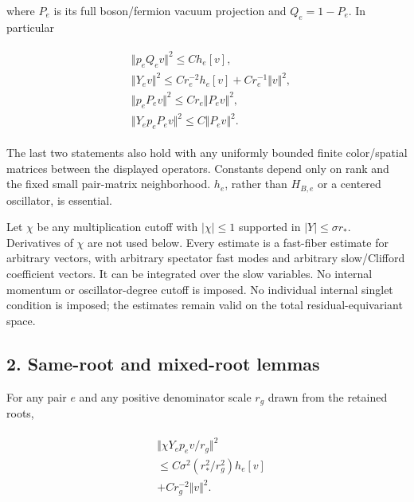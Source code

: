 where \(P_{e}\) is its full boson/fermion vacuum projection and
\(Q_{e}=1-P_{e}\). In particular

\begin{gather*}
\begin{aligned}
& \Vert p_{e} Q_{e} v\Vert ^{2} \le  C h_{e}[v], \\
& \Vert Y_{e} v\Vert ^{2} \le  C r_{e}^{-2} h_{e}[v] + C r_{e}^{-1} \Vert v\Vert ^{2}, \\
& \Vert p_{e} P_{e} v\Vert ^{2} \le  C r_{e} \Vert P_{e} v\Vert ^{2}, \\
& \Vert Y_{e} p_{e} P_{e} v\Vert ^{2} \le  C \Vert P_{e} v\Vert ^{2}.
\end{aligned}\tag{1}
\end{gather*}

The last two statements also hold with any uniformly bounded finite
color/spatial matrices between the displayed operators. Constants depend
only on rank and the fixed small pair-matrix neighborhood. \(h_{e}\),
rather than \(H_{B,e}\) or a centered oscillator, is essential.

Let \(\chi\) be any multiplication cutoff with
\(\vert \chi \vert \le 1\) supported in
\(\vert Y\vert \le \sigma  r_{*}\). Derivatives of \(\chi\) are not used
below. Every estimate is a fast-fiber estimate for arbitrary vectors,
with arbitrary spectator fast modes and arbitrary slow/Clifford
coefficient vectors. It can be integrated over the slow variables. No
internal momentum or oscillator-degree cutoff is imposed. No individual
internal singlet condition is imposed; the estimates remain valid on the
total residual-equivariant space.

\subsection{2. Same-root and mixed-root
lemmas}\label{e-same-root-and-mixed-root-lemmas}

For any pair \(e\) and any positive denominator scale \(r_{g}\) drawn
from the retained roots,

\begin{gather*}
\begin{aligned}
& \Vert \chi  Y_{e} p_{e} v/r_{g}\Vert ^{2} \\
& \le  C \sigma ^{2} (r_{*}^{2}/r_{g}^{2}) h_{e}[v] \\
& + C r_{g}^{-2} \Vert v\Vert ^{2}.
\end{aligned}\tag{2}
\end{gather*}

